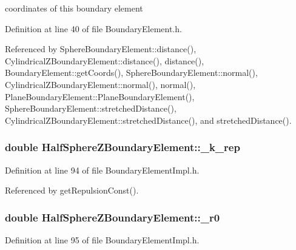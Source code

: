 coordinates of this boundary element 



Definition at line 40 of file Boundary\+Element.\+h.



Referenced by Sphere\+Boundary\+Element\+::distance(), Cylindrical\+Z\+Boundary\+Element\+::distance(), distance(), Boundary\+Element\+::get\+Coords(), Sphere\+Boundary\+Element\+::normal(), Cylindrical\+Z\+Boundary\+Element\+::normal(), normal(), Plane\+Boundary\+Element\+::\+Plane\+Boundary\+Element(), Sphere\+Boundary\+Element\+::stretched\+Distance(), Cylindrical\+Z\+Boundary\+Element\+::stretched\+Distance(), and stretched\+Distance().

\hypertarget{classHalfSphereZBoundaryElement_aaafd14a29987646f9537a7248ba6291b}{
\subsubsection[{\+\_\+k\+\_\+rep}]{\setlength{\rightskip}{0pt plus 5cm}double Half\+Sphere\+Z\+Boundary\+Element\+::\+\_\+k\+\_\+rep\hspace{0.3cm}{\ttfamily [private]}}}\label{classHalfSphereZBoundaryElement_aaafd14a29987646f9537a7248ba6291b}


Definition at line 94 of file Boundary\+Element\+Impl.\+h.



Referenced by get\+Repulsion\+Const().

\hypertarget{classHalfSphereZBoundaryElement_afa790cdbea557aa8615188211acaedce}{
\subsubsection[{\+\_\+r0}]{\setlength{\rightskip}{0pt plus 5cm}double Half\+Sphere\+Z\+Boundary\+Element\+::\+\_\+r0\hspace{0.3cm}{\ttfamily [private]}}}\label{classHalfSphereZBoundaryElement_afa790cdbea557aa8615188211acaedce}


Definition at line 95 of file Boundary\+Element\+Impl.\+h.



